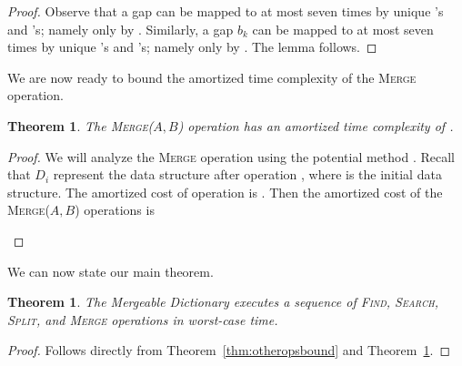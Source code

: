 \documentclass[11pt]{article}
\newcommand{\Ds}{Mergeable Dictionary}
\newcommand{\kwMs}{Make-Set}
\newcommand{\kwSpl}{Split}
\newcommand{\kwUnion}{Merge}
\newcommand{\kwSrc}{Search}
\newcommand{\kwFind}{Find}
\newcommand{\Ms}{\mbox{\textsc{\kwMs}}}
\newcommand{\Spl}{\mbox{\textsc{\kwSpl}}}
\newcommand{\Union}{\mbox{\textsc{\kwUnion{}}}}
\newcommand{\Unionx}[2]{\mbox{\textsc{\kwUnion(\ensuremath{#1,#2})}}}
\newcommand{\Src}{\mbox{\textsc{\kwSrc}}}
\newcommand{\Find}{\mbox{\textsc{\kwFind}}}
\newcommand{\bgap}[1]{\ensuremath{b_{#1}}}
\newcommand{\datast}[1]{\ensuremath{D_{#1}}}
\newcommand{\hide}[1]{}
\newcounter{count}
\newtheorem{thm}[count]{Theorem}
\begin{document}
\begin{proof} 
Observe that a gap  can be mapped to at most seven times by unique 's and 's; namely only by . Similarly, a gap \bgap{k} can be mapped to at most seven times by unique 's and 's; namely only by . The lemma follows. 
\end{proof} 


We are now ready to bound the amortized time complexity of the \Union{} operation. 


\begin{thm} 
\label{thm:unionamortizedcase} 
The \Unionx{A}{B} operation has an amortized time complexity of . 
\end{thm} 
\begin{proof} 
We will analyze the \Union{} operation using the potential method \cite{amortizedcomplexity}. Recall that \datast i represent the data structure after operation , where  is the initial data structure. The amortized cost of operation  is . Then the amortized cost of the \Unionx{A}{B} operations is 


{\allowdisplaybreaks
}
\end{proof} 
We can now state our main theorem. 

\begin{thm} 
\label{thm:maintheorem} 
The \Ds{} executes a sequence of  \hide{\Ms{}, }\Find{}, \Src{}, \Spl{}, and \Union{} operations \hide{,  of which are \Ms{} operations, }in worst-case  time. 
\end{thm} 

\begin{proof} 
Follows directly from Theorem~\ref{thm:otheropsbound} and Theorem~\ref{thm:unionamortizedcase}. 
\end{proof} 






\end{document}
